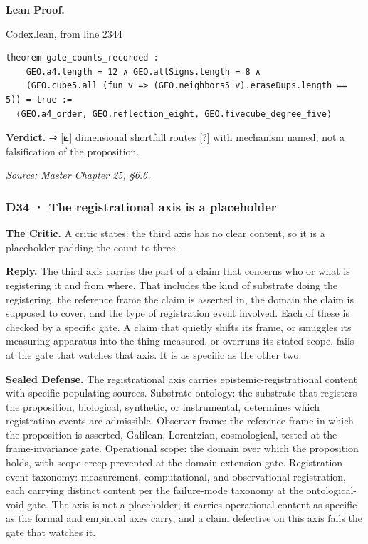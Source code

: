 \documentclass[10pt,twocolumn]{article}
\begin{document}
\textbf{Lean Proof.}

\begin{leanexcerpt}{Codex.lean, from line 2344}
\begin{lstlisting}[style=leanx,firstnumber=2344]
theorem gate_counts_recorded :
    GEO.a4.length = 12 ∧ GEO.allSigns.length = 8 ∧
    (GEO.cube5.all (fun v => (GEO.neighbors5 v).eraseDups.length == 5)) = true :=
  ⟨GEO.a4_order, GEO.reflection_eight, GEO.fivecube_degree_five⟩
\end{lstlisting}
\end{leanexcerpt}

\textbf{Verdict.} ⇒ {[}⟀{]} dimensional shortfall routes {[}?{]} with
mechanism named; not a falsification of the proposition.

\emph{Source: Master Chapter 25, §6.6.}

\hypertarget{d34-the-registrational-axis-is-a-placeholder}{%
\subsubsection{D34 · The registrational axis is a
placeholder}\label{d34-the-registrational-axis-is-a-placeholder}}

\textbf{The Critic.} A critic states: the third axis has no clear
content, so it is a placeholder padding the count to three.

\textbf{Reply.} The third axis carries the part of a claim that concerns
who or what is registering it and from where. That includes the kind of
substrate doing the registering, the reference frame the claim is
asserted in, the domain the claim is supposed to cover, and the type of
registration event involved. Each of these is checked by a specific
gate. A claim that quietly shifts its frame, or smuggles its measuring
apparatus into the thing measured, or overruns its stated scope, fails
at the gate that watches that axis. It is as specific as the other two.

\textbf{Sealed Defense.} The registrational axis carries
epistemic-registrational content with specific populating sources.
Substrate ontology: the substrate that registers the proposition,
biological, synthetic, or instrumental, determines which registration
events are admissible. Observer frame: the reference frame in which the
proposition is asserted, Galilean, Lorentzian, cosmological, tested at
the frame-invariance gate. Operational scope: the domain over which the
proposition holds, with scope-creep prevented at the domain-extension
gate. Registration-event taxonomy: measurement, computational, and
observational registration, each carrying distinct content per the
failure-mode taxonomy at the ontological-void gate. The axis is not a
placeholder; it carries operational content as specific as the formal
and empirical axes carry, and a claim defective on this axis fails the
gate that watches it.
\end{document}
